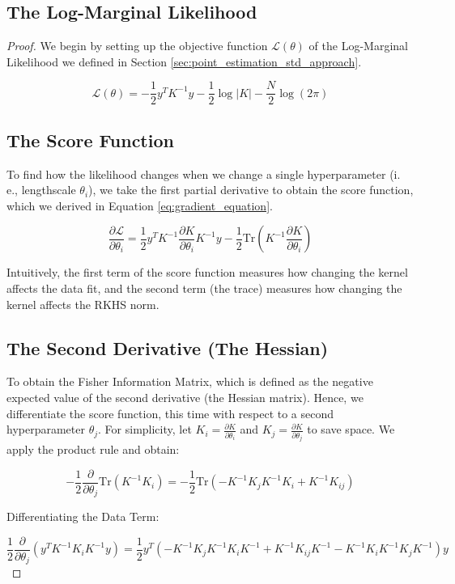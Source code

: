 \documentclass[12pt,oneside]{report}
\theoremstyle{definition}
\theoremstyle{remark}
\begin{document}
\subsection{The Log-Marginal Likelihood}
\begin{proof}
We begin by setting up the objective function $\mathcal{L}(\theta)$ of the Log-Marginal Likelihood we defined in Section \ref{sec:point_estimation_std_approach}.

$$\mathcal{L}(\theta) = -\frac{1}{2} y^T K^{-1} y - \frac{1}{2} \log \vert{}K\vert{} - \frac{N}{2} \log(2\pi)$$

\subsection{The Score Function}
To find how the likelihood changes when we change a single hyperparameter (i. e., lengthscale $\theta_i$), we take the first partial derivative to obtain the score function, which we derived in Equation \ref{eq:gradient_equation}. 

$$\frac{\partial \mathcal{L}}{\partial \theta_i} = \frac{1}{2} y^T K^{-1} \frac{\partial K}{\partial \theta_i} K^{-1} y - \frac{1}{2} \text{Tr}\left( K^{-1} \frac{\partial K}{\partial \theta_i} \right)$$

Intuitively, the first term of the score function measures how changing the kernel affects the data fit, and the second term (the trace) measures how changing the kernel affects the RKHS norm.

\subsection{The Second Derivative (The Hessian)}

To obtain the Fisher Information Matrix, which is defined as the negative expected value of the second derivative (the Hessian matrix). Hence, we differentiate the score function, this time with respect to a second hyperparameter $\theta_j$. For simplicity, let $K_i = \frac{\partial K}{\partial \theta_i}$ and $K_j = \frac{\partial K}{\partial \theta_j}$ to save space. We apply the product rule and obtain:

$$-\frac{1}{2} \frac{\partial}{\partial \theta_j} \text{Tr}(K^{-1} K_i) = -\frac{1}{2} \text{Tr}\left( -K^{-1} K_j K^{-1} K_i + K^{-1} K_{ij} \right)$$

Differentiating the Data Term:

\begin{equation}
\frac{1}{2} \frac{\partial}{\partial \theta_j} \left( y^T K^{-1} K_i K^{-1} y \right) = \frac{1}{2} y^T \left( -K^{-1} K_j K^{-1} K_i K^{-1} + K^{-1} K_{ij} K^{-1} - K^{-1} K_i K^{-1} K_j K^{-1} \right) y
\label{eq:quadratic_form_fim}
\end{equation}



\end{proof}
\end{document}
